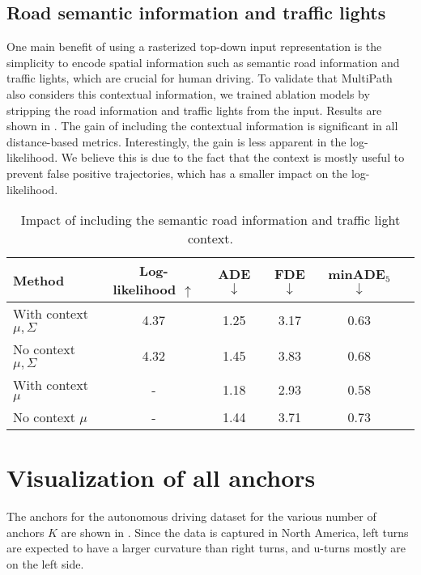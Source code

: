 \documentclass{article}
\newcommand{\multiflow}{MultiPath\xspace}
\begin{document}
\subsection{Road semantic information and traffic lights}
\label{sec:roadgraph}

One main benefit of using a rasterized top-down input representation is the simplicity to encode spatial information such as semantic road information and traffic lights, which are crucial for human driving. To validate that \multiflow also considers this contextual information, we trained ablation models by stripping the road information and traffic lights from the input. Results are shown in . The gain of including the contextual information is significant in all distance-based metrics. Interestingly, the gain is less apparent in the log-likelihood. We believe this is due to the fact that the context is mostly useful to prevent false positive trajectories, which has a smaller impact on the log-likelihood.


\begin{table}[!htbp]
\caption{Impact of including the semantic road information and traffic light context.}
\label{tbl:context}
\centering
\begin{tabular}{lccccc}
\toprule
\multirow{1}{*}{Method} & Log-likelihood $\uparrow$ & ADE $\downarrow$ & FDE $\downarrow$ & minADE$_5$ $\downarrow$ \tabularnewline
\midrule
With context $\mu,\Sigma$ & 4.37 & 1.25 & 3.17 & 0.63  \tabularnewline
No context $\mu,\Sigma$ & 4.32 & 1.45 & 3.83 & 0.68 \tabularnewline
\midrule 
With context $\mu$ & - & 1.18 & 2.93 & 0.58 \tabularnewline
No context $\mu$ & - & 1.44 & 	3.71 & 	0.73 \tabularnewline
\bottomrule
\end{tabular}
\end{table}


\section{Visualization of all anchors}
\label{sec:viz_clusters}

The anchors for the autonomous driving dataset for the various number of anchors $K$ are shown in . Since the data is captured in North America, left turns are expected to have a larger curvature than right turns, and u-turns mostly are on the left side. 
\end{document}
